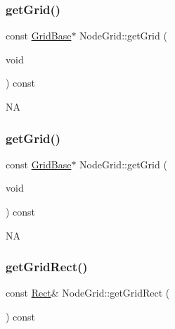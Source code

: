 \subsubsection{\texorpdfstring{get\+Grid()}{getGrid()}\hspace{0.1cm}{\footnotesize\ttfamily [3/4]}}
{\footnotesize\ttfamily const \hyperlink{classGridBase}{Grid\+Base}$\ast$ Node\+Grid\+::get\+Grid (\begin{DoxyParamCaption}\item[{void}]{ }\end{DoxyParamCaption}) const\hspace{0.3cm}{\ttfamily [inline]}}

NA \mbox{\label{classNodeGrid_aade5c184216fac8f3651bb0b84bbab17}} 
\subsubsection{\texorpdfstring{get\+Grid()}{getGrid()}\hspace{0.1cm}{\footnotesize\ttfamily [4/4]}}
{\footnotesize\ttfamily const \hyperlink{classGridBase}{Grid\+Base}$\ast$ Node\+Grid\+::get\+Grid (\begin{DoxyParamCaption}\item[{void}]{ }\end{DoxyParamCaption}) const\hspace{0.3cm}{\ttfamily [inline]}}

NA \mbox{\label{classNodeGrid_a8116f72215e420c5d075a590a53d24a3}} 
\subsubsection{\texorpdfstring{get\+Grid\+Rect()}{getGridRect()}\hspace{0.1cm}{\footnotesize\ttfamily [1/2]}}
{\footnotesize\ttfamily const \hyperlink{classRect}{Rect}\& Node\+Grid\+::get\+Grid\+Rect (\begin{DoxyParamCaption}{ }\end{DoxyParamCaption}) const\hspace{0.3cm}{\ttfamily [inline]}}



